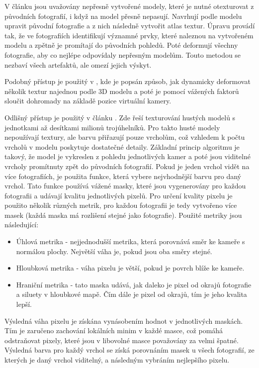 \documentclass[11pt,twoside,a4paper]{book}
\begin{document}
V článku \cite{multi-view-tex} jsou uvažovány nepřesně vytvořené modely, které
je nutné otexturovat z původních fotografií, i když na model přesně nepasují.
Navrhují podle modelu upravit původní fotografie a z nich následně vytvořit
atlas textur. Úpravu provádí tak, že ve fotografiích identifikují významné
prvky, které naleznou na vytvořeném modelu a zpětně je promítají do původních
pohledů. Poté deformují všechny fotografie, aby co nejlépe odpovídaly nepřesným
modelům. Touto metodou se nezbaví všech artefaktů, ale omezí jejich výskyt.

Podobný přístup je použitý v \cite{harmonized-texture-mapping}, kde je
popsán způsob, jak dynamicky deformovat několik textur najednou podle 3D modelu
a poté je pomocí vážených faktorů sloučit dohromady na základě pozice virtuální
kamery.

Odlišný přístup je použitý v článku \cite{masked-blending}. Zde řeší texturování
hustých modelů s jednotkami až desítkami milionů trojúhelníků. Pro takto husté
modely nepoužívají textury, ale barvu přiřazují pouze vrcholům, což vzhledem k
počtu vrcholů v modelu poskytuje dostatečné detaily. Základní princip algoritmu
je takový, že model je vykreslen z pohledu jednotlivých kamer a poté jsou
viditelné vrcholy promítnuty zpět do původních fotografií. Pokud je jeden vrchol
vidět na více fotografiích, je použita funkce, která vybere nejvhodnější barvu
pro daný vrchol. Tato funkce používá vážené masky, které jsou vygenerovány pro
každou fotografii a udávají kvalitu jednotlivých pixelů. Pro určení kvality
pixelu je použito několik různých metrik, pro každou fotografii je tedy
vytvořeno více masek (každá maska má rozlišení stejné jako fotografie). Použité
metriky jsou následující:
\begin{itemize}
  \item Úhlová metrika - nejjednodušší metrika, která porovnává směr ke kameře s 
  		normálou plochy. Největší váha je, pokud jsou oba směry stejné.
  \item Hloubková metrika - váha pixelu je větší, pokud je povrch blíže ke 
  		kameře.
  \item Hraniční metrika - tato maska udává, jak daleko je pixel od okrajů 
  		fotografie a siluety v hloubkové mapě. Čím dále je pixel od okrajů, 
  		tím je jeho kvalita lepší.
\end{itemize}
Výsledná váha pixelu je získána vynásobením hodnot v jednotlivých maskách. Tím 
je zaručeno zachování lokálních minim v každé masce, což pomáhá odstraňovat 
pixely, které jsou v libovolné masce považovány za velmi špatné. Výsledná barva 
pro každý vrchol se získá porovnáním masek u všech fotografií, ze kterých je daný 
vrchol viditelný, a následným vybráním nejlepšího pixelu.
\end{document}
